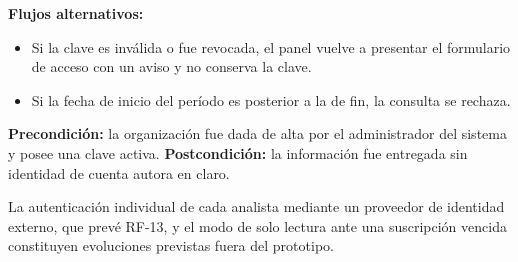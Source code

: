 \textbf{Flujos alternativos:}
\begin{itemize}
  \item Si la clave es inválida o fue revocada, el panel vuelve a presentar el formulario de acceso con un aviso y no conserva la clave.
  \item Si la fecha de inicio del período es posterior a la de fin, la consulta se rechaza.
\end{itemize}

\textbf{Precondición:} la organización fue dada de alta por el administrador del sistema y posee una clave activa.
\textbf{Postcondición:} la información fue entregada sin identidad de cuenta autora en claro.

La autenticación individual de cada analista mediante un proveedor de identidad externo, que prevé RF-13, y el modo de solo lectura ante una suscripción vencida constituyen evoluciones previstas fuera del prototipo.
